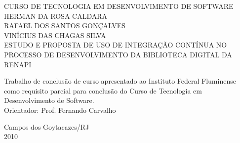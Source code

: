 \begin{titlepage}
 \begin{figure}[ht]
 \centering
 \end{figure}
 \begin{center}
   {\large CURSO DE TECNOLOGIA EM DESENVOLVIMENTO DE SOFTWARE} \\ [3.5cm]
   {\large HERMAN DA ROSA CALDARA} \\
   {\large RAFAEL DOS SANTOS GONÇALVES} \\
   {\large VINÍCIUS DAS CHAGAS SILVA} \\ [4cm]
   {\large ESTUDO E PROPOSTA DE USO DE INTEGRAÇÃO CONTÍNUA NO PROCESSO DE DESENVOLVIMENTO DA BIBLIOTECA DIGITAL DA RENAPI}\\ [2cm]
   \hspace{.45\textwidth} %
   \begin{minipage}{0.5\textwidth}
   \begin{espacosimples}
        Trabalho de conclusão de curso apresentado ao Instituto Federal Fluminense como requisito parcial para conclusão do Curso de Tecnologia em Desenvolvimento de Software.\\[1.5cm]
        Orientador: Prof. Fernando Carvalho
    \end{espacosimples}
    \end{minipage}
   \vfill
   {\large Campos dos Goytacazes/RJ} \\
   {\large 2010}
 \end{center}
\end{titlepage}
